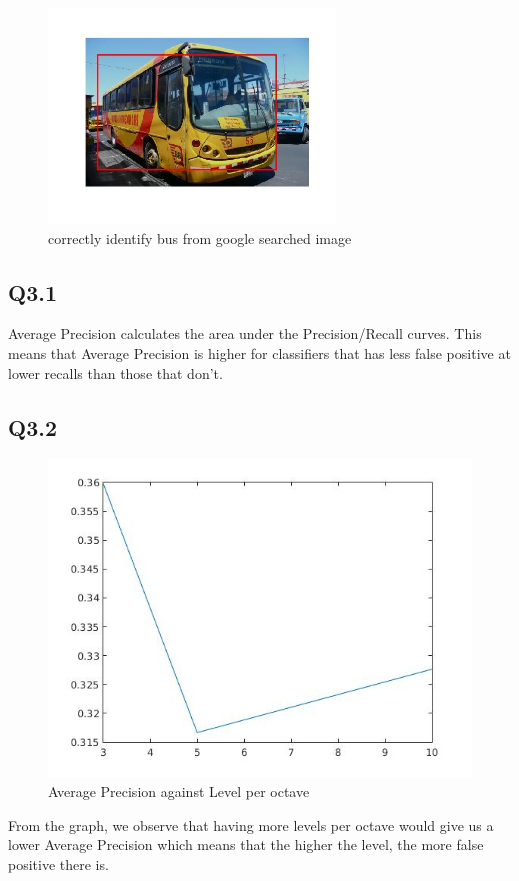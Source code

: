 \documentclass{article}
\begin{document}
\begin{figure}[H]
    \centering
    \includegraphics[width=3in]{./figures/q42_result3.jpg}
    \caption{correctly identify bus from google searched image}
\end{figure}

\subsection*{Q3.1}
Average Precision calculates the area under the Precision/Recall curves. This means that Average Precision is higher for classifiers that has less false positive at lower recalls than those that don't.

\subsection*{Q3.2}
\begin{figure}[H]
    \centering
    \includegraphics[width=6.5in]{./figures/q33.jpg}
    \caption{Average Precision against Level per octave}
\end{figure}
From the graph, we observe that having more levels per octave would give us a lower Average Precision which means that the higher the level, the more false positive there is.
\end{document}

